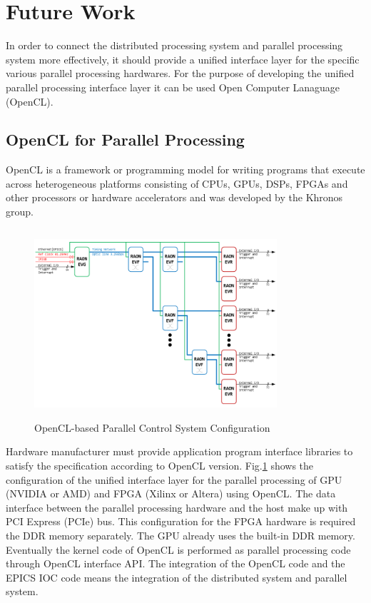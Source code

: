 \documentclass[journal]{IEEEtran}
\begin{document}
\section{Future Work}
In order to connect the distributed processing system and parallel processing system more effectively, it should provide a unified interface layer for the specific various parallel processing hardwares. For the purpose of developing the unified parallel processing interface layer it can be used  Open Computer Lanaguage (OpenCL).

\subsection{OpenCL for Parallel Processing}
OpenCL\cite{opencl_wiki} is a framework or programming model for writing programs that execute across heterogeneous platforms consisting of CPUs, GPUs, DSPs, FPGAs and other processors or hardware accelerators and was developed by the Khronos group. 
\begin{figure}[!htb]
	\centering
	\includegraphics*[width=90mm, height=70mm]{img02.png}
	\caption{OpenCL-based Parallel Control System Configuration}
	\label{opencl_control_system}
\end{figure}
Hardware manufacturer must provide application program interface libraries to satisfy the specification according to OpenCL version. Fig.\ref{opencl_control_system} shows the configuration of the unified interface layer for the parallel processing of GPU (NVIDIA or AMD) and FPGA (Xilinx or Altera) using OpenCL. The data interface between the parallel processing hardware and the host make up with PCI Express (PCIe) bus. This configuration for the FPGA hardware is required the DDR memory separately. The GPU already uses the built-in DDR memory. Eventually the kernel code of OpenCL is performed as parallel processing code through OpenCL interface API. The integration of the OpenCL code and the EPICS IOC code means the integration of the distributed system and parallel system.
\end{document}
